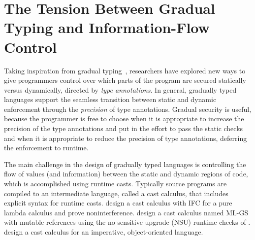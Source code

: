
\section{The Tension Between Gradual Typing and Information-Flow Control}

Taking inspiration from gradual typing~\parencite{Siek:2006bh,Siek:2007qy},
researchers have explored new ways to give programmers control over which parts
of the program are secured statically versus dynamically, directed by
\textit{type annotations}.
%
In general, gradually typed languages support the seamless transition between
static and dynamic enforcement through the \textit{precision} of type
annotations. Gradual security is useful, because the programmer is free to
choose when it is appropriate to increase the precision of the type annotations
and put in the effort to pass the static checks and when it is appropriate to
reduce the precision of type annotations, deferring the enforcement to runtime.

The main challenge in the design of gradually typed languages is controlling the
flow of values (and information) between the static and dynamic regions of code,
which is accomplished using runtime casts. Typically source programs are
compiled to an intermediate language, called a cast calculus, that includes
explicit syntax for runtime casts. \textcite{Disney:2011fv} design a cast
calculus with IFC for a pure lambda calculus and prove noninterference.
\textcite{Fennell:2013ab} design a cast calculus named ML-GS with mutable
references using the no-sensitive-upgrade (NSU) runtime checks of
\textcite{austin2009efficient}. \textcite{Fennell:2015aa} design a cast calculus
for an imperative, object-oriented language.

